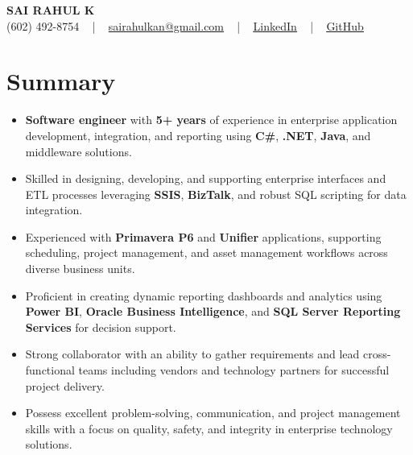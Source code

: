 \documentclass[letterpaper,11pt]{article}
\newcommand{\resumeItem}[1]{
  \item\footnotesize{
    {#1 \vspace{-2pt}}
  }
}
\newcommand{\resumeItemListStart}{\begin{itemize}[leftmargin=*]}
\newcommand{\resumeItemListEnd}{\end{itemize}\vspace{-5pt}}
\begin{document}
\begin{center}
    {\fontsize{14pt}{12pt}\selectfont \textbf{\MakeUppercase{Sai Rahul K}}}\\ \vspace{2pt}
    \fontsize{10pt}{12pt}\selectfont (602) 492-8754 ~ | ~ \href{mailto:sairahulkan@gmail.com}{sairahulkan@gmail.com} ~ | ~
    \href{https://www.linkedin.com/in/rq123/}{\color{blue}\underline{LinkedIn}} ~ | ~
    \href{https://github.com/kanrahuldo}{\color{blue}\underline{GitHub}}~
    \vspace{-8pt}
\end{center}

\section{Summary}
\fontsize{9pt}{10pt}\selectfont
\resumeItemListStart
    \resumeItem{\textbf{Software engineer} with \textbf{5+ years} of experience in enterprise application development, integration, and reporting using \textbf{C\#}, \textbf{.NET}, \textbf{Java}, and middleware solutions.} \vspace{-3pt}
    \resumeItem{Skilled in designing, developing, and supporting enterprise interfaces and ETL processes leveraging \textbf{SSIS}, \textbf{BizTalk}, and robust SQL scripting for data integration.} \vspace{-3pt}
    \resumeItem{Experienced with \textbf{Primavera P6} and \textbf{Unifier} applications, supporting scheduling, project management, and asset management workflows across diverse business units.} \vspace{-3pt}
    \resumeItem{Proficient in creating dynamic reporting dashboards and analytics using \textbf{Power BI}, \textbf{Oracle Business Intelligence}, and \textbf{SQL Server Reporting Services} for decision support.} \vspace{-3pt}
    \resumeItem{Strong collaborator with an ability to gather requirements and lead cross-functional teams including vendors and technology partners for successful project delivery.} \vspace{-3pt}
    \resumeItem{Possess excellent problem-solving, communication, and project management skills with a focus on quality, safety, and integrity in enterprise technology solutions.} \vspace{-3pt}
\resumeItemListEnd
\vspace{-6pt}
\end{document}
